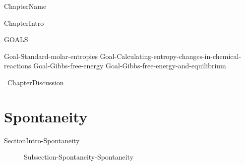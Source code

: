 \documentclass[main.tex]{subfiles}
\newcommand\chapterlabel{Ch-thermo}\setcounter{figurenewcounter}{0}\setcounter{tablenewcounter}{0}\setcounter{formulanewcounter}{0}\chapterpicture{../{\chapterlabel}/figure1}\chapterpicturelabel{PxFuel}
\begin{document}
  
 {ChapterName} 




  {ChapterIntro}


\begin{marginfigure}%
\begin{mytcbox}{GOALS}
\begin{enumerate}[label=\protect\circled{\color{white}\arabic*}]
{Goal-Standard-molar-entropies}
{Goal-Calculating-entropy-changes-in-chemical-reactions}	
{Goal-Gibbs-free-energy	}				
{Goal-Gibbs-free-energy-and-equilibrium}			
\end{enumerate}
\end{mytcbox}
\vspace{1cm}
\begin{tcolorbox}[enhanced,colback=red!5!white,colframe=black!50!red,boxrule=1pt,
  arc=0pt,outer arc=0pt,drop heavy lifted shadow]
\faGears\ 
  {ChapterDiscussion}
  \end{tcolorbox}
\end{marginfigure}%

\section{Spontaneity}
{SectionIntro-Spontaneity}
\sloppy\begin{description}
\item[] {Subsection-Spontaneity-Spontaneity}
\end{description}
\end{document}
